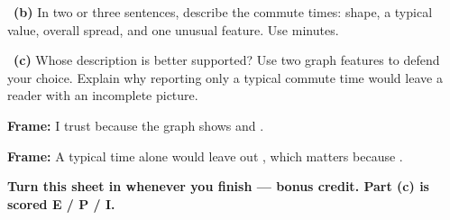 \documentclass[11pt]{article}
\begin{document}
~\textbf{(b)} In two or three sentences, describe the commute times: shape, a typical value, overall spread, and one unusual feature. Use minutes.\par
\workspace{1.5in}

~\textbf{(c)} Whose description is better supported? Use two graph features to defend your choice. Explain why reporting only a typical commute time would leave a reader with an incomplete picture.\par
\workspace{2.4in}

\begin{sentenceframebox}\raggedright\textbf{Frame:} I trust \blank[0.8in] because the graph shows \blank[1.6in] and \blank[1.6in].\end{sentenceframebox}

\begin{sentenceframebox}\raggedright\textbf{Frame:} A typical time alone would leave out \blank[2in], which matters because \blank[2in].\end{sentenceframebox}

\textbf{Turn this sheet in whenever you finish --- bonus credit. Part (c) is scored E / P / I.}\par

\end{document}
